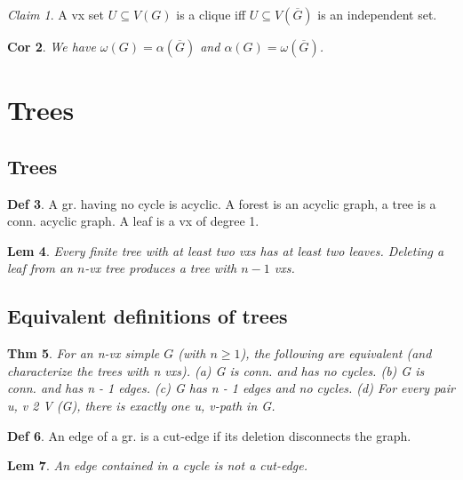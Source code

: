 \documentclass[11pt, fleqn, a4paper, landscape]{article}
\theoremstyle{plain} %
\newtheorem{thm}{Thm}
\newtheorem{lem}[thm]{Lem}
\newtheorem{cor}[thm]{Cor}
\theoremstyle{remark} %
\newtheorem{claim}[thm]{Claim}
\theoremstyle{definition} %
\newtheorem{defi}[thm]{Def}
\begin{document}
\begin{multicols}{5}
\begin{claim}
A vx set $U\subseteq V (G)$ is a clique iff $U\subseteq V(\overline{G})$ is an independent set.
\end{claim}

\begin{cor}
We have $\omega(G)=\alpha(\overline{G})$ and $\alpha(G)=\omega(\overline{G})$.
\end{cor}

\section{Trees}
\subsection{Trees}
\begin{defi}
A gr. having no cycle is acyclic. A forest is an acyclic graph, a tree is a conn. acyclic graph. A leaf is a vx of degree 1.
\end{defi}
\addtocounter{thm}{1}
\begin{lem}
Every finite tree with at least two vxs has at least two leaves. Deleting a leaf from an $n$-vx tree produces a tree with $n-1$ vxs.
\end{lem}

\subsection{Equivalent definitions of trees}

\begin{thm}
For an n-vx simple $G$ (with $n \ge 1$), the following are equivalent (and
characterize the trees with n vxs).
(a) G is conn. and has no cycles.
(b) G is conn. and has n - 1 edges.
(c) G has n - 1 edges and no cycles.
(d) For every pair u, v 2 V (G), there is exactly one u, v-path in G.
\end{thm}

\begin{defi}
An edge of a gr. is a cut-edge if its deletion disconnects the graph.
\end{defi}

\begin{lem}
An edge contained in a cycle is not a cut-edge.
\end{lem}


\addtocounter{thm}{1}


\end{multicols}
\end{document}
